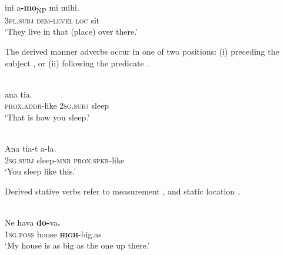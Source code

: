   



  



\ea%
\label{ex:7:16}
 \\
\gll {\textglotstop}ini {\ob}{\textglotstop}{a}\textbf{-mo}{\cb}\textsubscript{NP} mi   {mihi}.\\
   \textsc{3pl.subj} \textsc{dem-level} \textsc{loc} sit \\
\glt `They live in that (place) over there.'
\z

  

 

  

The derived manner adverbs occur in one of two positions: (i) preceding the subject , or (ii) following the predicate .



\ea%
\label{ex:7:17}
 \\
    ana  tia. \\
   \textsc{prox.addr}{}-like  \textsc{2sg.subj} sleep \\
\glt   `That is how you sleep.'
\z



 \ea%
\label{ex:7:18}
 \\
\gll Ana  tia-t  {{\textglotstop}}{a-la}{{\ng}}{.} \\
  \textsc{2sg.subj} sleep-\textsc{mnr} \textsc{prox.spkr}{}-like  \\
\glt   `You sleep like this.'
\z 
 
 



Derived stative verbs refer to measurement , and static location . 



\ea%
\label{ex:7:19}
 \\
\gll  Ne   hava  \textbf{{do-}}{va{\ng}}\textbf{{.}} \\
   \textsc{1sg.poss} house  \textbf{\textsc{high}}\textsc{{}-}big.as  \\
\glt   `My house is as big as the one up there.'
\z









